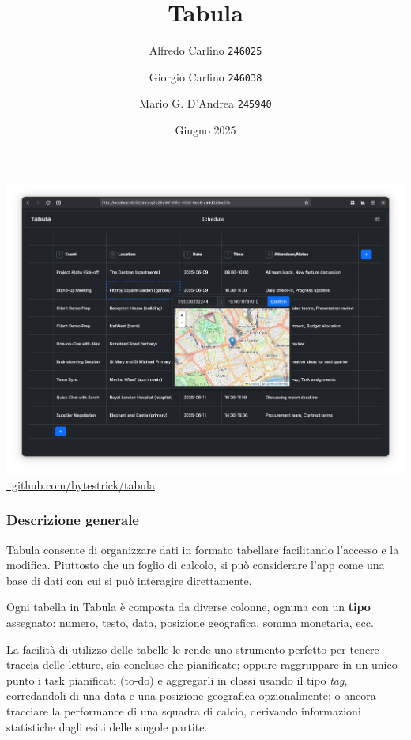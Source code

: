 \documentclass{beamer}
\title{Tabula}
\author{
  Alfredo Carlino \texttt{246025} \newline
  \and Giorgio Carlino \texttt{246038} \newline
  \and Mario G. D'Andrea \texttt{245940}}
\institute{Corso di Web Applications \\ C.d.S. Informatica $\cdot$ DeMaCs \\ Università della Calabria}
\date{Giugno 2025}
\begin{document}
\maketitle

\begin{frame}
  \includegraphics[width=\textwidth]{demo}
  \centering  \href{https://github.com/bytestrick/tabula}{\faGithub\ github.com/bytestrick/tabula}
\end{frame}

\begin{frame}
  \frametitle{Descrizione generale}

  Tabula consente di organizzare dati in formato tabellare facilitando l'accesso e la modifica. Piuttosto che un foglio di calcolo, si può considerare l'app come una base di dati con cui si può interagire direttamente.

  \vspace{10pt}

  Ogni tabella in Tabula è composta da diverse colonne, ognuna con un \textbf{tipo} assegnato: numero, testo, data, posizione geografica, somma monetaria, ecc.

  \vspace{10pt}

  La facilità di utilizzo delle tabelle le rende uno strumento perfetto per tenere traccia delle letture, sia concluse che pianificate; oppure raggruppare in un unico punto i task pianificati (to-do) e aggregarli in classi usando il tipo \textit{tag}, corredandoli di una data e una posizione geografica opzionalmente; o ancora tracciare la performance di una squadra di calcio, derivando informazioni statistiche dagli esiti delle singole partite.

\end{frame}
\end{document}
